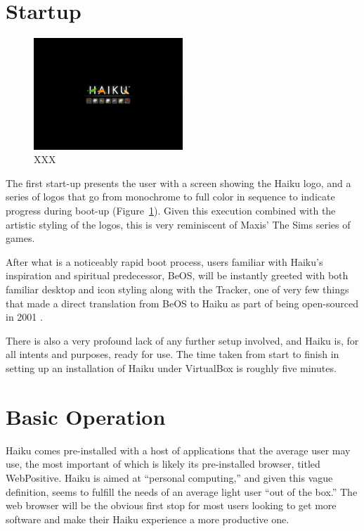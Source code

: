 \documentclass{article}
\newcommand{\figref}[1]{Figure~\ref{fig:#1}}
\begin{document}
\section{Startup}

\begin{figure}[h]
\centering
\includegraphics[width=0.5\textwidth]{figs/startup.png}
\caption{XXX}
\label{fig:startup}
\end{figure}

The first start-up presents the user with a screen showing the Haiku
logo, and a series of logos that go from monochrome to full color in
sequence to indicate progress during boot-up (\figref{startup}).
Given this execution combined with the artistic styling of the logos,
this is very reminiscent of Maxis’ The Sims series of games.

After what is a noticeably rapid boot process, users familiar with
Haiku’s inspiration and spiritual predecessor, BeOS, will be instantly
greeted with both familiar desktop and icon styling along with the
Tracker, one of very few things that made a direct translation from
BeOS to Haiku as part of being open-sourced in 2001 \cite{HaikuFaq}.

There is also a very profound lack of any further setup involved, and
Haiku is, for all intents and purposes, ready for use.  The time taken
from start to finish in setting up an installation of Haiku under
VirtualBox is roughly five minutes.

\section{Basic Operation}

Haiku comes pre-installed with a host of applications that the average
user may use, the most important of which is likely its pre-installed
browser, titled WebPositive.  Haiku is aimed at ``personal
computing,'' and given this vague definition, seems to fulfill the
needs of an average light user ``out of the box.'' The web browser
will be the obvious first stop for most users looking to get more
software and make their Haiku experience a more productive one.
	
\end{document}
